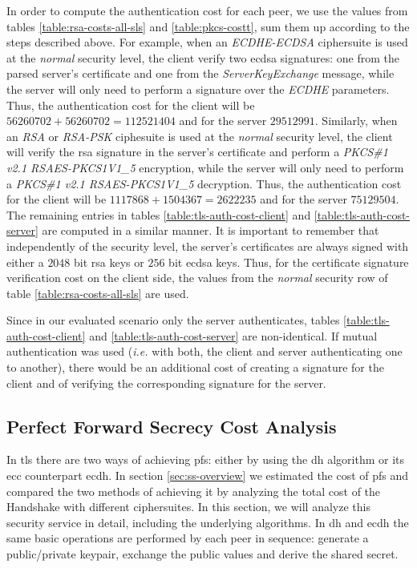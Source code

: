\documentclass{llncs}
\begin{document}
In order to compute the authentication cost for each peer, we use the values from tables \ref{table:rsa-costs-all-sls} and \ref{table:pkcs-costt},
sum them up according to the steps described above. For example, when an \textit{ECDHE-ECDSA} ciphersuite is used at the \textit{normal} security level,
the client verify two \gls{ecdsa} signatures: one from the parsed server's certificate
and one from the \textit{ServerKeyExchange} message, while the server will only need to perform a signature over the \textit{ECDHE} parameters.
Thus, the authentication cost for the client will be $56260702+56260702=112521404$ and for the server $29512991$. Similarly, when an \textit{RSA} or
\textit{RSA-PSK} ciphesuite is used at the \textit{normal} security level, the client will verify the \gls{rsa} signature in the server's certificate
and perform a \textit{PKCS\#1 v2.1 RSAES-PKCS1\-V1\_5} encryption, while the server will only need to perform a
\textit{PKCS\#1 v2.1 RSAES-PKCS1\-V1\_5} decryption. Thus, the authentication cost for the client will be $1117868+1504367=2622235$ and for the server
$75129504$. The remaining entries in tables \ref{table:tls-auth-cost-client} and \ref{table:tls-auth-cost-server} are computed in a similar manner.
It is important to remember that independently of the security level, the server's certificates are always signed with either a $2048$ bit \gls{rsa}
keys or $256$ bit \gls{ecdsa} keys. Thus, for the certificate signature verification cost on the client side, the values from the \textit{normal}
security row of table \ref{table:rsa-costs-all-sls} are used.

Since in our evaluated scenario only the server authenticates, tables \ref{table:tls-auth-cost-client} and \ref{table:tls-auth-cost-server}
are non-identical. If mutual authentication was used (\textit{i.e.} with both, the client and server authenticating one to another), there would be
an additional cost of creating a signature for the client and of verifying the corresponding signature for the server.

\subsection{Perfect Forward Secrecy Cost Analysis} \label{sec:pfs-costs}

In \gls{tls} there are two ways of achieving \gls{pfs}: either by using the \gls{dh} algorithm or its \gls{ecc} counterpart \gls{ecdh}.
In section \ref{sec:ss-overview} we estimated the cost of \gls{pfs} and compared the two methods of achieving it by analyzing the total cost of the
Handshake with different ciphersuites. In this section, we will analyze this security service in detail, including the underlying algorithms.
In \gls{dh} and \gls{ecdh} the same basic operations are performed by each peer in sequence: generate a public/private keypair, exchange the public values
and derive the shared secret.
\end{document}
